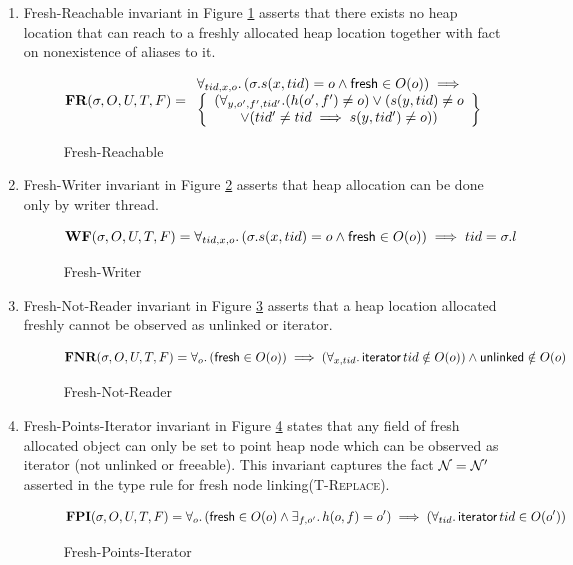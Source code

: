 \begin{enumerate}
\begin{figure}[!htb]
\end{figure}
\item{Fresh-Reachable} invariant in Figure \ref{fig:freach} asserts that there exists no heap location that can reach to a freshly allocated heap location together with fact on nonexistence of aliases to it.
\begin{figure}[!htb]
  \[
  \textbf{FR}(\sigma,O,U,T,F) =
 \begin{array}{ll}
   \forall_{tid,x,o} \ldotp (\sigma.s(x,tid) = o \land \textsf{fresh} \in O(o) ) \implies \\
   \left\{
	\begin{array}{cl}
          (\forall_{y,o',f',tid'}. (h(o',f') \neq o) \lor  (s(y,tid) \neq  o \\
          \lor (tid'\neq tid \implies s(y,tid') \neq o ))
        \end{array}
        \right\}
        \end{array}
\]
\caption{Fresh-Reachable}
\label{fig:freach}
\end{figure}

\item{Fresh-Writer} invariant in Figure \ref{fig:fmut} asserts that heap allocation can be done only by writer thread.
  \begin{figure}[!htb]
  \[
\textbf{WF}(\sigma,O,U,T,F) =
 \forall_{tid,x,o} \ldotp (\sigma.s(x,tid) = o \land \textsf{fresh} \in O(o) ) \implies  tid = \sigma.l 
\]
\caption{Fresh-Writer}
\label{fig:fmut}
  \end{figure}
\item{Fresh-Not-Reader} invariant in Figure \ref{fig:fnotreader} asserts that a heap location allocated freshly cannot be observed as \textsf{unlinked} or \textsf{iterator}.
  \begin{figure}[!htb]
  \[
\textbf{FNR}(\sigma,O,U,T,F) =
 \forall_{o} \ldotp (\textsf{fresh} \in O(o) ) \implies  (\forall_{x,tid} \ldotp \textsf{iterator}\,tid  \notin O(o)  ) \land \textsf{unlinked} \notin O(o) 
\]
\caption{Fresh-Not-Reader}
\label{fig:fnotreader}
  \end{figure}
\item{Fresh-Points-Iterator} invariant in Figure \ref{fig:fsinglefield} states that any field of fresh allocated object can only be set to point heap node which can be observed as \textsf{iterator} (not \textsf{unlinked or freeable}).  This invariant captures the fact $\mathcal{N} = \mathcal{N}'$ asserted in the type rule for fresh node linking(\textsc{T-Replace}). 
  \begin{figure}[!htb]
  \[
\textbf{FPI}(\sigma,O,U,T,F) =
 \forall_{o} \ldotp (\textsf{fresh} \in O(o)  \land \exists_{f,o'}\ldotp h(o,f)=o') \implies (\forall_{tid} \ldotp  \textsf{iterator}\,tid \in O(o')) 
\]
\caption{Fresh-Points-Iterator}
\label{fig:fsinglefield}
  \end{figure}
   

\end{enumerate}
